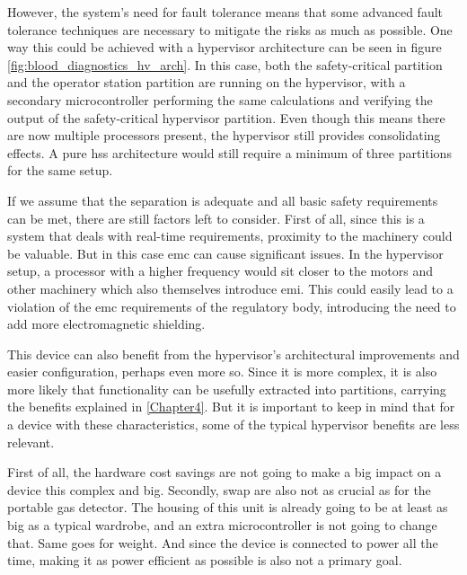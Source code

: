 However, the system's need for fault tolerance means that some advanced fault tolerance techniques are necessary to mitigate the risks as much as possible. One way this could be achieved with a hypervisor architecture can be seen in figure \ref{fig:blood_diagnostics_hv_arch}. In this case, both the safety-critical partition and the operator station partition are running on the hypervisor, with a secondary microcontroller performing the same calculations and verifying the output of the safety-critical hypervisor partition. Even though this means there are now multiple processors present, the hypervisor still provides consolidating effects. A pure \acrshort{hss} architecture would still require a minimum of three partitions for the same setup.

If we assume that the separation is adequate and all basic safety requirements can be met, there are still factors left to consider. First of all, since this is a system that deals with real-time requirements, proximity to the machinery could be valuable. But in this case \acrshort{emc} can cause significant issues. In the hypervisor setup, a processor with a higher frequency would sit closer to the motors and other machinery which also themselves introduce \acrlong{emi}. This could easily lead to a violation of the \acrshort{emc} requirements of the regulatory body, introducing the need to add more electromagnetic shielding. 

This device can also benefit from the hypervisor's architectural improvements and easier configuration, perhaps even more so. Since it is more complex, it is also more likely that functionality can be usefully extracted into partitions, carrying the benefits explained in \ref{Chapter4}. But it is important to keep in mind that for a device with these characteristics, some of the typical hypervisor benefits are less relevant.

First of all, the hardware cost savings are not going to make a big impact on a device this complex and big. Secondly, \acrshort{swap} are also not as crucial as for the portable gas detector. The housing of this unit is already going to be at least as big as a typical wardrobe, and an extra microcontroller is not going to change that. Same goes for weight. And since the device is connected to power all the time, making it as power efficient as possible is also not a primary goal.

